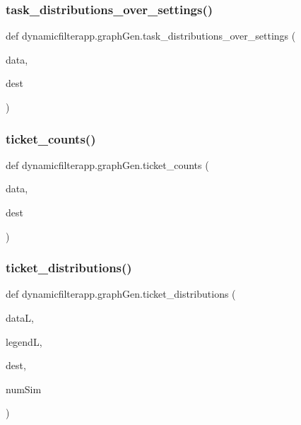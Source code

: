 \subsubsection{\texorpdfstring{task\+\_\+distributions\+\_\+over\+\_\+settings()}{task\_distributions\_over\_settings()}}
{\footnotesize\ttfamily def dynamicfilterapp.\+graph\+Gen.\+task\+\_\+distributions\+\_\+over\+\_\+settings (\begin{DoxyParamCaption}\item[{}]{data,  }\item[{}]{dest }\end{DoxyParamCaption})}

\mbox{\label{namespacedynamicfilterapp_1_1graph_gen_ade6ccfe6b14b9f3fa663d9f6cd2898b4}} 
\subsubsection{\texorpdfstring{ticket\+\_\+counts()}{ticket\_counts()}}
{\footnotesize\ttfamily def dynamicfilterapp.\+graph\+Gen.\+ticket\+\_\+counts (\begin{DoxyParamCaption}\item[{}]{data,  }\item[{}]{dest }\end{DoxyParamCaption})}

\mbox{\label{namespacedynamicfilterapp_1_1graph_gen_a5b53dfee6e695f00b609c9f39978803b}} 
\subsubsection{\texorpdfstring{ticket\+\_\+distributions()}{ticket\_distributions()}}
{\footnotesize\ttfamily def dynamicfilterapp.\+graph\+Gen.\+ticket\+\_\+distributions (\begin{DoxyParamCaption}\item[{}]{dataL,  }\item[{}]{legendL,  }\item[{}]{dest,  }\item[{}]{num\+Sim }\end{DoxyParamCaption})}

